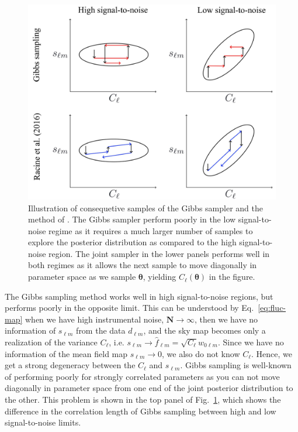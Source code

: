 \documentclass[twocolumn]{../common/aa}
\begin{document}
\begin{figure}
	\centering
	\includegraphics[width=\linewidth]{figures/parameter-estimation.jpg}
	\caption{\label{fig:illustration}Illustration of consequetive samples of the Gibbs sampler and the method of \cite{racine:2016}. The Gibbs sampler perform poorly in the low signal-to-noise regime as it requires a much larger number of samples to explore the posterior distribution as compared to the high signal-to-noise region. The joint sampler in the lower panels performs well in both regimes as it allows the next sample to move diagonally in parameter space as we sample $\boldsymbol{\theta}$, yielding $C_\ell(\boldsymbol{\theta})$ in the figure.}
\end{figure}

The Gibbs sampling method works well in high signal-to-noise regions, but performs poorly in the opposite limit. This can be understood by Eq.~\eqref{eq:fluc-map} when we have high instrumental noise, $\boldsymbol{N} \rightarrow \infty$, then we have no information of $s_{\ell m}$ from the data $d_{\ell m}$, and the sky map becomes only a realization of the variance $C_{\ell}$, i.e. $s_{\ell m} \rightarrow \hat{f}_{\ell m} = \sqrt{C_{\ell}} w_{0\ell m}$. Since we have no information of the mean field map $\hat{s}_{\ell m} \rightarrow 0$, we also do not know $C_\ell$. Hence, we get a strong degeneracy between the $C_\ell$ and $s_{\ell m}$. Gibbs sampling is well-known of performing poorly for strongly correlated parameters as you can not move diagonally in parameter space from one end of the joint posterior distribution to the other. This problem is shown in the top panel of Fig.~\ref{fig:illustration}, which shows the difference in the correlation length of Gibbs sampling between high and low signal-to-noise limits.
\end{document}
